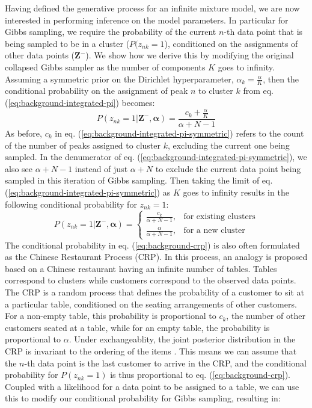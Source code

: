 Having defined the generative process for an infinite mixture model, we are now interested in performing inference on the model parameters. In particular for Gibbs sampling, we require the probability of the current $n$-th data point that is being sampled to be in a cluster ($P(z_{nk}=1$), conditioned on the assignments of other data points ($\boldsymbol{Z}^{-}$). We show how we derive this by modifying the original collapsed Gibbs sampler as the number of components $K$ goes to infinity. Assuming a symmetric prior on the Dirichlet hyperparameter, $\alpha_k=\frac{\alpha}{K}$, then the conditional probability on the assignment of peak $n$ to cluster $k$ from eq. (\ref{eq:background-integrated-pi}) becomes:
\begin{equation}
P(z_{nk}=1 \vert \boldsymbol{Z}^{-}, \boldsymbol{\alpha}) = \frac{c_k + \frac{\alpha}{K}}{\alpha+N-1}
\label{eq:background-integrated-pi-symmetric}
\end{equation}
As before, $c_k$ in eq. (\ref{eq:background-integrated-pi-symmetric}) refers to the count of the number of peaks assigned to cluster $k$, excluding the current one being sampled. In the denumerator of eq. (\ref{eq:background-integrated-pi-symmetric}), we also see $\alpha+N-1$ instead of just $\alpha+N$ to exclude the current data point being sampled in this iteration of Gibbs sampling. Then taking the limit of eq. (\ref{eq:background-integrated-pi-symmetric}) as $K$ goes to infinity results in the following conditional probability for $z_{nk}=1$:
\begin{equation}
P(z_{nk}=1 \vert \boldsymbol{Z}^{-}, \boldsymbol{\alpha}) = 
\begin{cases}
    \frac{c_k}{\alpha+N-1}, & \text{for existing clusters} \\
    \frac{\alpha}{\alpha+N-1}, & \text{for a new cluster}
\end{cases}
\label{eq:background-crp}
\end{equation}
The conditional probability in eq. (\ref{eq:background-crp}) is also often formulated as the Chinese Restaurant Process (CRP). In this process, an analogy is proposed based on a Chinese restaurant having an infinite number of tables. Tables correspond to clusters while customers correspond to the observed data points. The CRP is a random process that defines the probability of a customer to sit at a particular table, conditioned on the seating arrangements of other customers. For a non-empty table, this probability is proportional to $c_k$, the number of other customers seated at a table, while for an empty table, the probability is proportional to $\alpha$. Under exchangeablity, the joint posterior distribution in the CRP is invariant to the ordering of the items \cite{aldous1985exchangeability}. This means we can assume that the $n$-th data point is the last customer to arrive in the CRP, and the conditional probability for $P(z_{nk}=1)$ is thus proportional to eq. (\ref{eq:background-crp}). Coupled with a likelihood for a data point to be assigned to a table, we can use this to modify our conditional probability for Gibbs sampling, resulting in:
